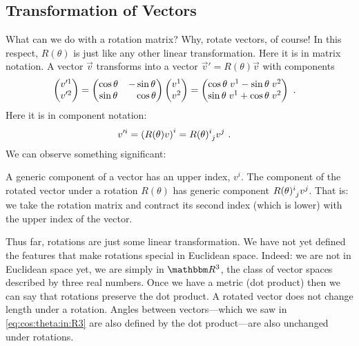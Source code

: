 \documentclass[12pt]{article}
\begin{document}
\subsection{Transformation of Vectors}

What can we do with a rotation matrix? Why, rotate vectors, of course! In this respect, $R(\theta)$ is just like any other linear transformation. Here it is in matrix notation. A vector $\vec{v}$ transforms into a vector $\vec{v}' = R(\theta)\vec{v}$ with components
\begin{align}
    \begin{pmatrix}
        v'^1\\ v'^2
    \end{pmatrix}
    =
    \begin{pmatrix}
        \cos\theta & - \sin\theta \\
        \sin\theta & \pp \cos \theta
    \end{pmatrix}
    \begin{pmatrix}
        v^1 \\ v^2
    \end{pmatrix}
    &= 
    \begin{pmatrix}
        \cos\theta\; v^1 - \sin\theta\; v^2\\
        \sin\theta\; v^1 + \cos\theta\; v^2
    \end{pmatrix} \ .
\end{align}
Here it is in component notation:
\begin{align}
    v'^i =
    \left(R(\theta)v\right)^i &= 
    R(\theta)\aij{i}{j}v^j \ .
    \label{eq:col:vector:rotation}
\end{align}
We can observe something significant:
\begin{bigidea}\label{idea:upper:index:rotates:with:R}
A generic component of a vector has an upper index, $v^i$. The component of the rotated vector under a rotation $R(\theta)$ has generic component $R(\theta)\aij{i}{j}v^j$. That is: we take the rotation matrix and contract its second index (which is lower) with the upper index of the vector. 
\end{bigidea}



Thus far, rotations are just some linear transformation. We have not yet defined the features that make rotations special in Euclidean space. Indeed: we are not in Euclidean space yet, we are simply in $\RR ^3$, the class of vector spaces described by three real numbers. Once we have a metric (dot product) then we can say that rotations preserve the dot product. A rotated vector does not change length under a rotation. Angles between vectors---which we saw in \eqref{eq:cos:theta:in:R3} are also defined by the dot product---are also unchanged under rotations. 
\end{document}
